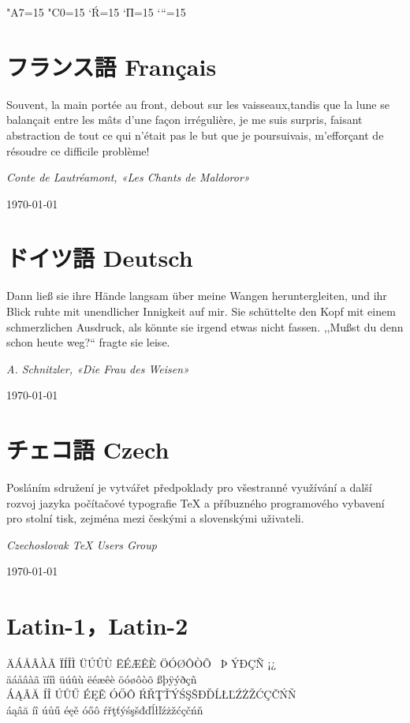 \documentclass{ujarticle}
\begin{document}
\kcatcode"A7=15%
\kcatcode"C0=15%
\kcatcode`Ŕ=15
\kcatcode`П=15
\kcatcode`“=15

\section{フランス語 Français}
Souvent, la main portée au front, debout sur les 
vaisseaux,tandis que la lune se balançait entre 
les mâts d'une façon irrégulière, je me suis surpris, 
faisant abstraction de tout ce qui n'était pas le but 
que je poursuivais, m'efforçant de résoudre ce 
difficile problème!

\hfill {\em Conte de Lautréamont, «Les Chants de Maldoror»}%
\qquad\qquad

\hfill\today


\section{ドイツ語 Deutsch}
Dann ließ sie ihre Hände langsam über meine Wangen
heruntergleiten, und ihr Blick ruhte mit unendlicher
Innigkeit auf mir.
Sie schüttelte den Kopf mit einem schmerzlichen Ausdruck,
als könnte sie irgend etwas nicht fassen.
,,Mußst du denn schon heute weg?{}`` 
fragte sie leise.

\hfill {\em A. Schnitzler, «Die Frau des Weisen»}%
\qquad\qquad

\hfill\today


%
\section{チェコ語 Czech}
Posláním sdružení je vytvářet předpoklady 
pro všestranné využívání a další rozvoj jazyka 
počítačové typografie \TeX{} a příbuzného programového 
vybavení pro stolní tisk, 
zejména mezi českými a slovenskými uživateli.

\hfill {\em Czechoslovak \TeX{} Users Group}%
\qquad\qquad

\hfill\today


\section{Latin-1，Latin-2}
ÄÁÅÂÀÃ ÏÍÎÌ ÜÚÛÙ ËÉÆÊÈ ÖÓØÔÒÕ ~Þ ÝÐÇÑ ¡¿\\
äáåâàã ïíîì üúûù ëéæêè öóøôòõ ßþÿýðçñ\\
ÁĄÂĂ ÍÎ Ú{Ů}Ű ÉĘĚ ÓŐÔ 
ŔŘŢŤÝŚŞŠĐĎĹŁĽŹŻŽĆÇČŃŇ\\
áąâă íî ú{ů}ű éęě óőô 
ŕřţťýśşšđďĺłľźżžćçčńň
\end{document}
